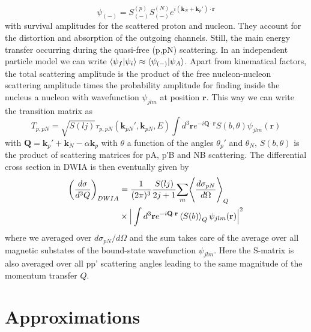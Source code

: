 \documentclass[11pt]{article}
\numberwithin{equation}{section}
\begin{document}
\begin{equation}
	\psi_{(-)} = S_{(-)}^{(p)}S_{(-)}^{(N)} e^{i(\mathbf{k}_N + \mathbf{k}_{p}')\cdot \mathbf{r}}
\end{equation}
with survival amplitudes for the scattered proton and nucleon. They account for the distortion and absorption of the outgoing channels. Still, the main energy transfer occurring during the quasi-free (p,pN) scattering. In an independent particle model we can write $\braket{\psi_f | \psi_i} \approx \braket{\psi_{(-)} | \psi_A}$. Apart from kinematical factors, the total scattering amplitude is the product of the free nucleon-nucleon scattering amplitude times the probability amplitude for finding inside the nucleus a nucleon with wavefunction $\psi_{jlm}$ at position $\mathbf{r}$. This way we can write the transition matrix as
\begin{equation}
	T_{p,pN} = \sqrt{S(lj)} \tau_{p,pN}(\mathbf{k}_{pN}',\mathbf{k}_{pN}, E) \int d^3 \mathbf{r} e^{-i \mathbf{Q} \cdot \mathbf{r}} S(b,\theta) \psi_{jlm}(\mathbf{r})
\end{equation}
with $\mathbf{Q} = \mathbf{k}_p' + \mathbf{k}_N - \alpha \mathbf{k}_p$ with $\theta$ a function of the angles $\theta_p'$ and $\theta_N$, $S(b,\theta)$ is the product of scattering matrices for pA, p′B and NB scattering. The differential cross section in DWIA is then eventually given by
\begin{align}
\begin{split}
	\left(\frac{d\sigma}{d^3Q}\right)_{DWIA} &= \frac{1}{(2\pi)^3} \frac{S(lj)}{2j+1} \underset{m} \sum \Bigg\langle \frac{d\sigma_{pN}}{d\Omega}\Bigg\rangle_Q\\
	& \times \Big | \int d^3 \mathbf{r} e^{-i \mathbf{Q}\cdot \mathbf{r}} \braket{S(b)}_Q \psi_{jlm}(\mathbf{r})\Big |^2 
\end{split}
\end{align}
where we averaged over $d\sigma_{pN}/d\Omega$ and the sum takes care of the average over all magnetic substates of the bound-state wavefunction $\psi_{jlm}$. Here the S-matrix is also averaged over all pp' scattering angles leading to the same magnitude of the momentum transfer $Q$.

\section{Approximations}
\end{document}
